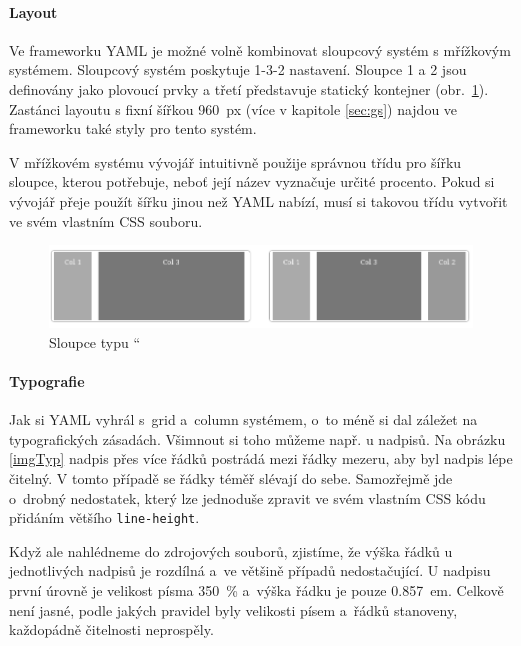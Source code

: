 \documentclass[thesis=B,czech]{FITthesis}[2012/06/26]
\begin{document}
\paragraph{Layout}

Ve frameworku YAML je možné volně kombinovat sloupcový systém s mřížkovým systémem. Sloupcový systém poskytuje 1-3-2 nastavení. Sloupce 1 a 2 jsou definovány jako plovoucí prvky a třetí představuje statický kontejner (obr.~\ref{imgCol}). Zastánci layoutu s fixní šířkou 960~px (více v kapitole \ref{sec:gs}) najdou ve frameworku také styly pro tento systém. 

V mřížkovém systému vývojář intuitivně použije správnou třídu pro šířku sloupce, kterou potřebuje, neboť její název vyznačuje určité procento. Pokud si vývojář přeje použít šířku jinou než YAML nabízí, musí si takovou třídu vytvořit ve svém vlastním CSS souboru.  

\begin{figure}[h]
	\begin{center}
	\includegraphics[scale=0.6]{images/image05.png}
	\end{center}
	\caption{Sloupce typu \textquotedblleft \cite{yaml}}
	\label{imgCol}
\end{figure}

\paragraph{Typografie}

Jak si YAML vyhrál s~grid a~column systémem, o~to méně si dal záležet na typografických zásadách. Všimnout si toho můžeme např. u nadpisů. Na obrázku \ref{imgTyp} nadpis přes více řádků postrádá mezi řádky mezeru, aby byl nadpis lépe čitelný. V tomto případě se řádky téměř slévají do sebe. Samozřejmě jde o~drobný nedostatek, který lze jednoduše zpravit ve svém vlastním CSS kódu přidáním většího \verb#line-height#.

Když ale nahlédneme do zdrojových souborů, zjistíme, že výška řádků u jednotlivých nadpisů je rozdílná a~ve většině případů nedostačující. U nadpisu první úrovně je velikost písma 350~\% a~výška řádku je pouze 0.857~em. Celkově není jasné, podle jakých pravidel byly velikosti písem a~řádků stanoveny, každopádně čitelnosti neprospěly.
\end{document}
